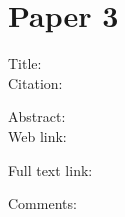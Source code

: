 \documentclass{scrartcl}
\begin{document}
\section*{Paper 3}
\begin{description}
	\item[Title:]
	\item[Citation:] \cite{}
	\item[Abstract:]
	\item[Web link:] \url{}
	\item[Full text link:] \url{}
	\item[Comments:] 
\end{description}








\end{document}
